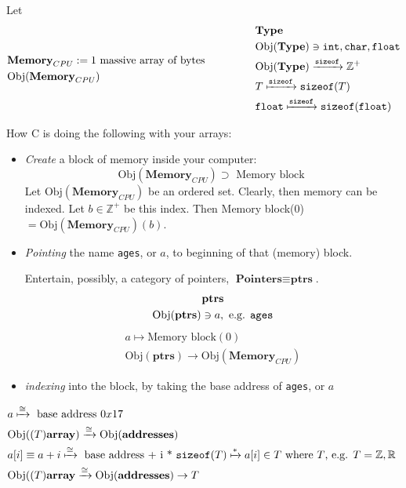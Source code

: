 \documentclass[10pt]{amsart}
\begin{document}
\begin{multicols*}{2}
Let 
\[
\begin{gathered}
\begin{aligned}
& \textbf{Memory}_{CPU} := 1 \text{ massive array of bytes } \\
& \text{Obj}{(\textbf{Memory}_{CPU})} 
\end{aligned}  \qquad \, \qquad \, 
\begin{aligned}
& \textbf{Type} \\
& \text{Obj}{(\textbf{Type})} \ni \verb|int|, \verb|char|, \verb|float| \\
& \text{Obj}{(\textbf{Type})}  \xrightarrow{\texttt{sizeof}} \mathbb{Z}^+  \\
& T \xmapsto{ \texttt{sizeof} } \verb|sizeof|(T) \\
& \verb|float| \xmapsto{ \texttt{sizeof}} \verb|sizeof|(\verb|float|)
\end{aligned}
\end{gathered}
\]


How C is doing the following with your arrays:  

\begin{itemize}
	\item \emph{Create} a block of memory inside your computer:  
	\[
	\text{Obj}{(\textbf{Memory}_{CPU})} \supset \text{ Memory block }  
	\]
	Let $\text{Obj}{(\textbf{Memory}_{CPU})}$ be an ordered set.  Clearly, then memory can be indexed.  Let $b\in \mathbb{Z}^+$ be this index.  Then Memory block(0) $= \text{Obj}{(\textbf{Memory}_{CPU})}(b)$.  		
	\item \emph{Pointing} the name \verb|ages|, or $a$, to beginning of that (memory) block.  
	
	Entertain, possibly, a category of pointers, $\textbf{Pointers} \equiv \textbf{ptrs}$.  
	\[
	\begin{gathered}
	\textbf{ptrs} \\
	\text{Obj}{(\textbf{ptrs})} \ni a, \text{ e.g. } \verb|ages|  
	\end{gathered}
	\]	
	\[
	\begin{gathered}
	a \mapsto \text{Memory block}(0) \\ 
	\text{Obj}{(\textbf{ptrs})} \to \text{Obj}{(\textbf{Memory}_{CPU})}
	\end{gathered}
	\]
	\item \emph{indexing} into the block, by taking the base address of \verb|ages|, or $a$ 
\end{itemize}

\[
\begin{gathered}
\begin{aligned}
&	a \xmapsto{ \cong } \text{ base address $0x17$ } \\
&	\text{Obj}{((T)\textbf{array})} \xrightarrow{ \cong } \text{Obj}{(\textbf{addresses})}  \\	
&	a[i] \equiv a+i \xmapsto{ \cong } \text{ base address + i * } \verb|sizeof|(T)  \xmapsto{ * } a[i] \in T \text{ where $T$, e.g. $T = \mathbb{Z},\mathbb{R}$ } \\ 
& \text{Obj}{((T)\textbf{array}} \xrightarrow{ \cong } \text{Obj}{(\textbf{addresses})} \to T  
\end{aligned}
\end{gathered}
\]


\end{multicols*}
\end{document}
